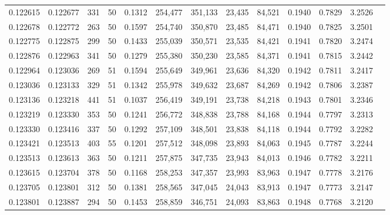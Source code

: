 \begin{tabular}{rrrrrrrrrrrrr}
0.122615 & 0.122677 &   331 &  50 &                                     0.1312 & 254,477 & 351,133 &  23,435 &  84,521 & 0.1940 & 0.7829 & 3.2526 \\
0.122678 & 0.122772 &   263 &  50 &                                     0.1597 & 254,740 & 350,870 &  23,485 &  84,471 & 0.1940 & 0.7825 & 3.2501 \\
0.122775 & 0.122875 &   299 &  50 &                                     0.1433 & 255,039 & 350,571 &  23,535 &  84,421 & 0.1941 & 0.7820 & 3.2474 \\
0.122876 & 0.122963 &   341 &  50 &                                     0.1279 & 255,380 & 350,230 &  23,585 &  84,371 & 0.1941 & 0.7815 & 3.2442 \\
0.122964 & 0.123036 &   269 &  51 &                                     0.1594 & 255,649 & 349,961 &  23,636 &  84,320 & 0.1942 & 0.7811 & 3.2417 \\
0.123036 & 0.123133 &   329 &  51 &                                     0.1342 & 255,978 & 349,632 &  23,687 &  84,269 & 0.1942 & 0.7806 & 3.2387 \\
0.123136 & 0.123218 &   441 &  51 &                                     0.1037 & 256,419 & 349,191 &  23,738 &  84,218 & 0.1943 & 0.7801 & 3.2346 \\
0.123219 & 0.123330 &   353 &  50 &                                     0.1241 & 256,772 & 348,838 &  23,788 &  84,168 & 0.1944 & 0.7797 & 3.2313 \\
0.123330 & 0.123416 &   337 &  50 &                                     0.1292 & 257,109 & 348,501 &  23,838 &  84,118 & 0.1944 & 0.7792 & 3.2282 \\
0.123421 & 0.123513 &   403 &  55 &                                     0.1201 & 257,512 & 348,098 &  23,893 &  84,063 & 0.1945 & 0.7787 & 3.2244 \\
0.123513 & 0.123613 &   363 &  50 &                                     0.1211 & 257,875 & 347,735 &  23,943 &  84,013 & 0.1946 & 0.7782 & 3.2211 \\
0.123615 & 0.123704 &   378 &  50 &                                     0.1168 & 258,253 & 347,357 &  23,993 &  83,963 & 0.1947 & 0.7778 & 3.2176 \\
0.123705 & 0.123801 &   312 &  50 &                                     0.1381 & 258,565 & 347,045 &  24,043 &  83,913 & 0.1947 & 0.7773 & 3.2147 \\
0.123801 & 0.123887 &   294 &  50 &                                     0.1453 & 258,859 & 346,751 &  24,093 &  83,863 & 0.1948 & 0.7768 & 3.2120 \\

\end{tabular}
